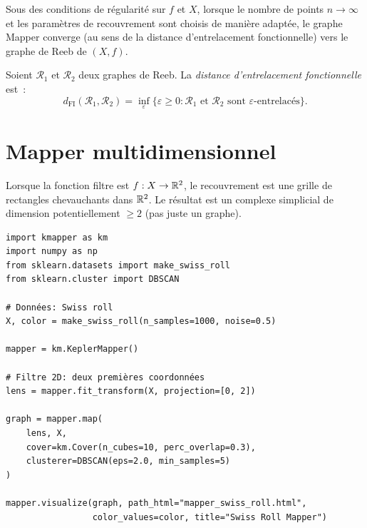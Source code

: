 \begin{theoreme}
Sous des conditions de r\'egularit\'e sur $f$ et $X$, lorsque le
nombre de points $n \to \infty$ et les param\`etres de recouvrement
sont choisis de mani\`ere adapt\'ee, le graphe Mapper converge (au sens
de la distance d'entrelacement fonctionnelle) vers le graphe de Reeb
de $(X, f)$.
\end{theoreme}

\begin{definition}
Soient $\mathcal{R}_1$ et $\mathcal{R}_2$ deux graphes de Reeb. La
\emph{distance d'entrelacement fonctionnelle} est~:
\[
  d_{\mathrm{FI}}(\mathcal{R}_1, \mathcal{R}_2) =
  \inf_{\varepsilon} \{\varepsilon \geq 0 :
  \mathcal{R}_1 \text{ et } \mathcal{R}_2 \text{ sont }
  \varepsilon\text{-entrelac\'es}\}.
\]
\end{definition}

\section{Mapper multidimensionnel}

\begin{definition}[Mapper 2D]
Lorsque la fonction filtre est $f : X \to \mathbb{R}^2$, le recouvrement est
une grille de rectangles chevauchants dans $\mathbb{R}^2$. Le r\'esultat est un
complexe simplicial de dimension potentiellement $\geq 2$ (pas juste un
graphe).
\end{definition}

\begin{codeblock}[title=\textbf{Mapper 2D avec KeplerMapper}]
\begin{verbatim}
import kmapper as km
import numpy as np
from sklearn.datasets import make_swiss_roll
from sklearn.cluster import DBSCAN

# Données: Swiss roll
X, color = make_swiss_roll(n_samples=1000, noise=0.5)

mapper = km.KeplerMapper()

# Filtre 2D: deux premières coordonnées
lens = mapper.fit_transform(X, projection=[0, 2])

graph = mapper.map(
    lens, X,
    cover=km.Cover(n_cubes=10, perc_overlap=0.3),
    clusterer=DBSCAN(eps=2.0, min_samples=5)
)

mapper.visualize(graph, path_html="mapper_swiss_roll.html",
                 color_values=color, title="Swiss Roll Mapper")
\end{verbatim}
\end{codeblock}

